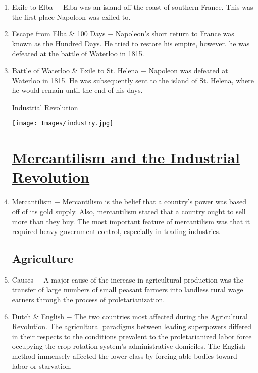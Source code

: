 \documentclass[12pt]{article}
\begin{document}
\begin{enumerate}
\item Exile to Elba $-$ Elba was an island off the coast of southern France. This was the first place Napoleon was exiled to.

\item Escape from Elba \& 100 Days $-$ Napoleon's short return to France was known as the Hundred Days. He tried to restore his empire, however, he was defeated at the battle of Waterloo in 1815.

\item Battle of Waterloo \& Exile to St. Helena $-$ Napoleon was defeated at Waterloo in 1815. He was subsequently sent to the island of St. Helena, where he would remain until the end of his days.

\newpage
\begin{center}
\end{center}
\begin{center}
\end{center}
\begin{center}
\underline{\Huge Industrial Revolution}
\end{center}
\vspace{50pt}
\texttt{[image: Images/industry.jpg]}
\newpage

\section[\underline{Mercantilism, Agricultural Revolution, \& Industrial Revolution}]{\underline{Mercantilism and the Industrial Revolution}}

\item Mercantilism $-$ Mercantilism is the belief that a country's power was based off of its gold supply. Also, mercantilism stated that a country ought to sell more than they buy. The most important feature of mercantilism was that it required heavy government control, especially in trading industries.


\subsection{Agriculture}

\item Causes $-$ A major cause of the increase in agricultural production was the transfer of large numbers of small peasant farmers into landless rural wage earners through the process of proletarianization. 

\item Dutch \& English $-$ The two countries most affected during the Agricultural Revolution. The agricultural paradigms between leading superpowers differed in their respects to the conditions prevalent to the proletarianized labor force occupying the crop rotation system's administrative domiciles. The English method immensely affected the lower class by forcing able bodies toward labor or starvation.
 

\end{enumerate}
\end{document}
